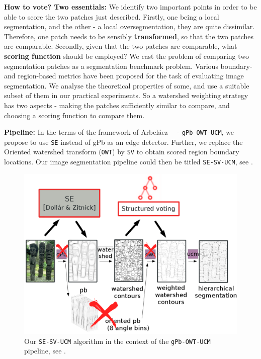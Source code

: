 \textbf{How to vote? Two essentials:} We identify two important points in order to be able to score the two patches just described. 
Firstly, one being a local segmentation, and the other - a local oversegmentation, they are quite dissimilar. Therefore, one patch needs to be sensibly \textbf{transformed}, so that the two patches are comparable. 
Secondly, given that the two patches are comparable, what \textbf{scoring function} should be employed? We cast the problem of comparing two segmentation patches as a segmentation benchmark problem. Various boundary- and region-based metrics have been proposed for the task of evaluating image segmentation. We analyse the theoretical properties of some, and use a suitable %
subset of them in our practical experiments. 
So a watershed weighting strategy has two aspects - making the patches sufficiently similar to compare, and choosing a scoring function to compare them.

\textbf{Pipeline:} In the terms of the framework of Arbel\'aez~\etal~\cite{Arbelaez11} - {\tt gPb-OWT-UCM}, we propose to use {\tt SE} instead of gPb as an edge detector. Further, we replace the Oriented watershed transform ({\tt OWT}) by {\tt SV} to obtain scored region boundary locations. Our image segmentation pipeline could then be titled {\tt SE-SV-UCM}, see .

\begin{figure}[ht!]
\centering
 \includegraphics[width=1\textwidth]{images/SE-SV-UCM/SE-SV-UCM_pipeline.png}
\caption[Our {\tt SE-SV-UCM} algorithm in the context of the {\tt gPb-OWT-UCM} pipeline]{Our {\tt SE-SV-UCM} algorithm in the context of the {\tt gPb-OWT-UCM} pipeline, see .}
\label{fig:SE-SV-UCM-pipeline}
\end{figure}

